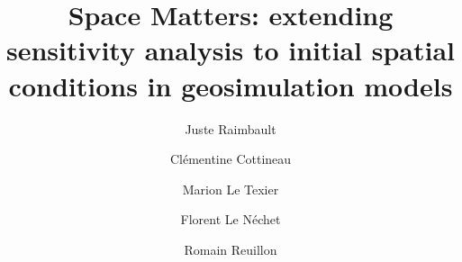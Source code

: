 \documentclass[3p,times,procedia]{elsarticle}
\begin{document}


\begin{frontmatter}

\dochead{}

\title{Space Matters: extending sensitivity analysis to initial spatial conditions in geosimulation models
}

\author[a,b]{Juste Raimbault}
\author[c,d]{Cl{\' e}mentine Cottineau}
\author[e]{Marion Le Texier}
\author[f]{Florent Le N{\' e}chet}
\author[a]{Romain Reuillon}


\address[a]{UPS CNRS 3611 ISC-PIF, Paris, France}
\address[b]{UMR CNRS 8504 G{\'e}ographie-cit{\'e}s, Paris, France}
\address[c]{Centre for Advanced Spatial Analysis, University College London, UK}
\address[d]{UMR CNRS 8097 Centre Maurice Halbwachs, Paris, France}
\address[e]{UMR 6266 IDEES, Universit{\'e} de Rouen Normandie, France}
\address[f]{Université Paris-Est, Laboratoire Ville Mobilité Transport, Marne-la-Vallée, France}









\end{frontmatter}
\end{document}
